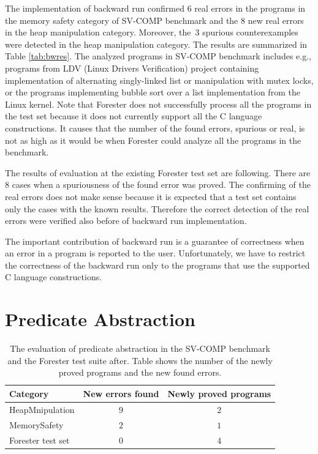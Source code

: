 The implementation of backward run confirmed $6$ real errors in the programs
in the memory safety category of SV-COMP benchmark and
the $8$ new real errors in the heap manipulation category.
Moreover, the~$3$ spurious counterexamples were detected in the heap manipulation category.
The results are summarized in Table \ref{tab:bwres}.
The analyzed programs in SV-COMP benchmark includes 
e.g., programs from LDV (Linux Drivers Verification) project
containing implementation of alternating singly-linked list
or manipulation with mutex locks, or the programs
implementing bubble sort over a list implementation from the Linux kernel.
Note that Forester does not successfully process all the programs in the test set
because it does not currently support all the C language constructions.
It causes that the number of the found errors, spurious or real, is not as high as it would be when
Forester could analyze all the programs in the benchmark.

The results of evaluation at the existing Forester test set are following.
There are $8$ cases when a spuriousness of the found error was proved.
The confirming of the real errors does not make sense because
it is expected that a test set contains only the cases with the known results.
Therefore the correct detection of the real errors were verified
also before of backward run implementation.

The important contribution of backward run is a guarantee of correctness when
an error in a program is reported to the user.
Unfortunately, we have to restrict the correctness of the backward run
only to the programs that use the supported C language constructions.

\section{Predicate Abstraction}
\label{sec:paeval}

\begin{table}[bt]
	\vskip6pt
	\caption{The evaluation of predicate abstraction
	in the SV-COMP benchmark and the Forester test suite after.
	Table shows the number of the newly proved programs and the new found
	errors.}
	\centering
	\begin{tabular}{lcc}
		\toprule
		Category & New errors found & Newly proved programs  \\
		\midrule
		HeapMnipulation & $9$ & $2$ \\
		MemorySafety & $2$ & $1$ \\
		Forester test set & $0$ & $4$  \\
		\bottomrule
	\end{tabular}
	\label{tab:pares}
\end{table}

